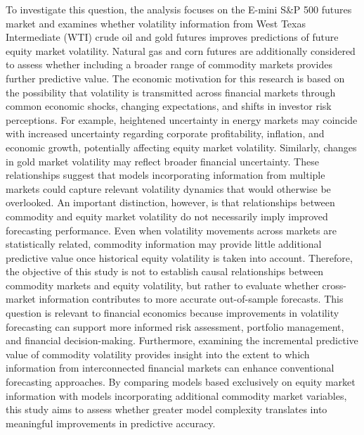 \documentclass{report}
\begin{document}
\vspace{1em}
To investigate this question, the analysis focuses on the E-mini S\&P 500 futures market and examines whether volatility information from West Texas Intermediate (WTI) crude oil and gold futures improves predictions of future equity market volatility. Natural gas and corn futures are additionally considered to assess whether including a broader range of commodity markets provides further predictive value.
\vspace{1em}
The economic motivation for this research is based on the possibility that volatility is transmitted across financial markets through common economic shocks, changing expectations, and shifts in investor risk perceptions. For example, heightened uncertainty in energy markets may coincide with increased uncertainty regarding corporate profitability, inflation, and economic growth, potentially affecting equity market volatility. Similarly, changes in gold market volatility may reflect broader financial uncertainty. These relationships suggest that models incorporating information from multiple markets could capture relevant volatility dynamics that would otherwise be overlooked.
\vspace{1em}
An important distinction, however, is that relationships between commodity and equity market volatility do not necessarily imply improved forecasting performance. Even when volatility movements across markets are statistically related, commodity information may provide little additional predictive value once historical equity volatility is taken into account. Therefore, the objective of this study is not to establish causal relationships between commodity markets and equity volatility, but rather to evaluate whether cross-market information contributes to more accurate out-of-sample forecasts.
\vspace{1em}
This question is relevant to financial economics because improvements in volatility forecasting can support more informed risk assessment, portfolio management, and financial decision-making. Furthermore, examining the incremental predictive value of commodity volatility provides insight into the extent to which information from interconnected financial markets can enhance conventional forecasting approaches. By comparing models based exclusively on equity market information with models incorporating additional commodity market variables, this study aims to assess whether greater model complexity translates into meaningful improvements in predictive accuracy.
\vspace{1em}
\end{document}
